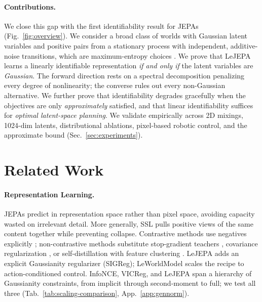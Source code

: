 \documentclass{article}
\begin{document}
\paragraph{Contributions.}
We close this gap with the first identifiability result for JEPAs (Fig.~\ref{fig:overview}).
We consider a broad class of worlds with Gaussian latent variables and positive pairs from a stationary process with independent, additive-noise transitions, which are maximum-entropy choices \citep{jaynes1957information}. We prove that LeJEPA learns a linearly identifiable representation \textit{if and only if} the latent variables are \textit{Gaussian}. The forward direction rests on a spectral decomposition penalizing every degree of nonlinearity; the converse rules out every non-Gaussian alternative. We further prove that identifiability degrades gracefully when the objectives are only \textit{approximately} satisfied, and that linear identifiability suffices for \textit{optimal latent-space planning}. We validate empirically across 2D mixings, 1024-dim latents, distributional ablations, pixel-based robotic control, and the approximate bound (Sec.~\ref{sec:experiments}).




\section{Related Work}
\label{sec:related}


\paragraph{Representation Learning.}
JEPAs \citep{lecun2022, assran2023ijepa, bardes2024vjepa, assran2025vjepa2} predict in representation space rather than pixel space, avoiding capacity wasted on irrelevant detail. More generally, SSL pulls positive views of the same content together while preventing collapse. Contrastive methods \citep{chen2020simple, he2020momentum} use negatives explicitly \citep[InfoNCE,][]{oord2018representation}; non-contrastive methods substitute stop-gradient teachers \citep{grill2020, chen2021exploring}, covariance regularization \citep[VICReg,][]{bardes2022, zbontar2021}, or self-distillation with feature clustering \citep{caron2021emerging, simeoni2025dinov3}. LeJEPA \citep{balestriero2025lejepa} adds an explicit Gaussianity regularizer (SIGReg); LeWorldModel \citep{maes2026leworldmodel} scales the recipe to action-conditioned control. InfoNCE, VICReg, and LeJEPA span a hierarchy of Gaussianity constraints, from implicit \citep{wang2020understanding, li2023rethinking, eftekhari2025importance, betser2026infonce} through second-moment to full; we test all three (Tab.~\ref{tab:scaling-comparison}, App.~\ref{app:gennorm}).
\end{document}
